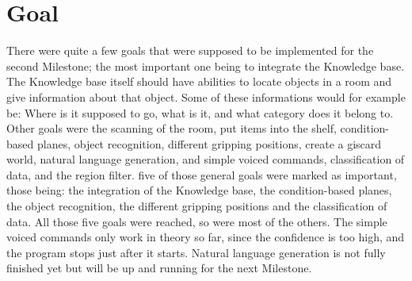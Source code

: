\documentclass[main.tex]{subfiles}
\begin{document}
	
    \chapter{Goal}
		
    There were quite a few goals that were supposed to be implemented for the second Milestone; the most important one being to integrate the Knowledge base. The Knowledge base itself should have abilities to locate objects in a room and give information about that object. Some of these informations would for example be: Where is it supposed to go, what is it, and what category does it belong to.
    Other goals were the scanning of the room, put items into the shelf, condition-based planes, object recognition, different gripping positions, create a giscard world, natural language generation, and simple voiced commands, classification of data, and the region filter. 
    five of those general goals were marked as important, those being: the integration of the Knowledge base, the condition-based planes, the object recognition, the different gripping positions and the classification of data. All those five goals were reached, so were most of the others. The simple voiced commands only work in theory so far, since the confidence is too high, and the program stops just after it starts. Natural language generation is not fully finished yet but will be up and running for the next Milestone.
    
\end{document}
